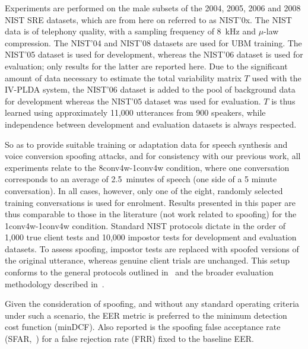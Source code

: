 
Experiments are performed on the male subsets of the 2004, 2005, 2006 and 2008 NIST SRE datasets, which are from here on referred to as NIST'0x.  The NIST data is of telephony quality, with a sampling frequency of 8~kHz and $\mu$-law compression.
The NIST'04 and NIST'08 datasets are used for UBM training.
The NIST'05 dataset is used for development, whereas the NIST'06 dataset is used for evaluation;  
only results for the latter are reported here.
Due to the significant amount of data necessary to estimate the total variability matrix $T$ used with the IV-PLDA system, the NIST'06 dataset is added to the pool of background data for development whereas the NIST'05 dataset was used for evaluation. 
$T$ is thus learned using approximately 11,000 utterances from 900 speakers, while independence between development and evaluation datasets is always respected.
 
So as to provide suitable training or adaptation data for speech synthesis and voice conversion spoofing attacks, and for consistency with our previous work, all experiments relate to the 8conv4w-1conv4w condition, where one conversation corresponds to an average of 2.5~minutes of speech (one side of a 5 minute conversation).
In all cases, however, only one of the eight, randomly selected training conversations is used for enrolment. 
Results presented in this paper are thus comparable to those in the literature (not work related to spoofing) for the 1conv4w-1conv4w condition. 
Standard NIST protocols dictate in the order of 1,000 true client tests and 10,000 impostor tests for development and evaluation datasets. 
To assess spoofing, impostor tests are replaced with spoofed versions of the original utterance, whereas genuine client trials are unchanged.
This setup conforms to the general protocols outlined in~\cite{Wu2014a} and the broader evaluation methodology described in~\cite{Hadid2015}.

Given the consideration of spoofing, and without any standard operating criteria under such a scenario, the EER metric is preferred to the minimum detection cost function (minDCF).  Also reported is the spoofing false acceptance rate (SFAR,~\cite{Johnson2010}) for a false rejection rate (FRR) fixed to the baseline EER.

